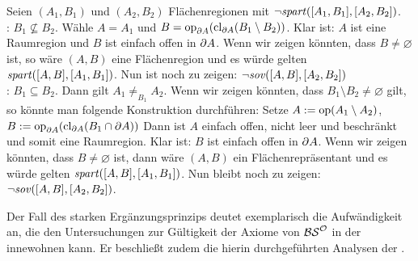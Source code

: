     \begin{bewidee}
        Seien $(A_1,B_1)$ und $(A_2,B_2)$ Flächenregionen mit $\neg \mathit{spart}([A_1,B_1],[A_2,B_2])$.\\
    
        : $B_1 \nsubseteq B_2$. 
            Wähle $A = A_1$ und $B = \text{op}_{\partial A}(\text{cl}_{\partial A}(B_1 \setminus B_2))$.
            Klar ist: $A$ ist eine Raumregion und $B$ ist einfach offen in $\partial A$.
            Wenn wir zeigen könnten, dass $B \neq \varnothing$ ist, so wäre $(A,B)$ eine Flächenregion und es würde gelten $\mathit{spart}([A,B],[A_1,B_1])$.
            Nun ist noch zu zeigen: $\neg \mathit{sov}([A,B],[A_2,B_2])$\\
        
        : $B_1 \subseteq B_2$.
            Dann gilt $A_1 \neq_{B_1} A_2$.
            Wenn wir zeigen könnten, dass $B_1 \setminus B_2 \neq \varnothing$ gilt, so könnte man folgende Konstruktion durchführen:
            Setze $A := \text{op}(A_1 \setminus A_2)$, $B := \text{op}_{\partial A}(\text{cl}_{\partial A}(B_1 \cap \partial A))$
            Dann ist $A$ einfach offen, nicht leer und beschränkt und somit eine Raumregion.
            Klar ist: $B$ ist einfach offen in $\partial A$. 
            Wenn wir zeigen könnten, dass $B \neq \varnothing$ ist, dann wäre $(A,B)$ ein Flächenrepräsentant und es würde gelten $\mathit{spart}([A,B],[A_1,B_1])$.
            Nun bleibt noch zu zeigen: $\neg \mathit{sov}([A,B],[A_2,B_2])$.
                
    \end{bewidee}
%
Der Fall des starken Ergänzungsprinzips deutet exemplarisch die Aufwändigkeit an,
die den Untersuchungen zur Gültigkeit der Axiome von $\mathcal{BS}^{\mathcal{O}}$ in der \strukt innewohnen kann.
Er beschließt zudem die hierin durchgeführten Analysen der \strukt.
    



